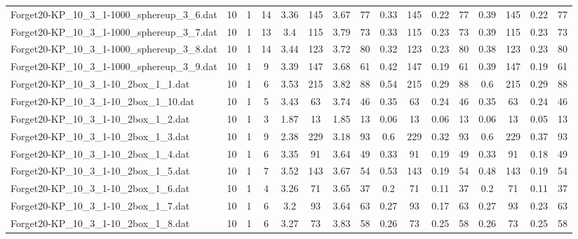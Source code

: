 \begin{sidewaystable}[!ht]
{\begin{tabular}{lccccccccccccccc}
Forget20-KP\_10\_3\_1-1000\_sphereup\_3\_6.dat & 10 & 1 & 14 & 3.36 & 145 & 3.67 & 77 & 0.33 & 145 &  \textcolor{blue2}{0.22} & 77 & 0.39 & 145 &  \textcolor{blue2}{0.22} & 77 \\
Forget20-KP\_10\_3\_1-1000\_sphereup\_3\_7.dat & 10 & 1 & 13 & 3.4 & 115 & 3.79 & 73 & 0.33 & 115 &  \textcolor{blue2}{0.23} & 73 & 0.39 & 115 &  \textcolor{blue2}{0.23} & 73 \\
Forget20-KP\_10\_3\_1-1000\_sphereup\_3\_8.dat & 10 & 1 & 14 & 3.44 & 123 & 3.72 & 80 & 0.32 & 123 &  \textcolor{blue2}{0.23} & 80 & 0.38 & 123 &  \textcolor{blue2}{0.23} & 80 \\
Forget20-KP\_10\_3\_1-1000\_sphereup\_3\_9.dat & 10 & 1 & 9 & 3.39 & 147 & 3.68 & 61 & 0.42 & 147 &  \textcolor{blue2}{0.19} & 61 & 0.39 & 147 &  \textcolor{blue2}{0.19} & 61 \\
Forget20-KP\_10\_3\_1-10\_2box\_1\_1.dat & 10 & 1 & 6 & 3.53 & 215 & 3.82 & 88 & 0.54 & 215 &  \textcolor{blue2}{0.29} & 88 & 0.6 & 215 &  \textcolor{blue2}{0.29} & 88 \\
Forget20-KP\_10\_3\_1-10\_2box\_1\_10.dat & 10 & 1 & 5 & 3.43 & 63 & 3.74 & 46 & 0.35 & 63 &  \textcolor{blue2}{0.24} & 46 & 0.35 & 63 &  \textcolor{blue2}{0.24} & 46 \\
Forget20-KP\_10\_3\_1-10\_2box\_1\_2.dat & 10 & 1 & 3 & 1.87 & 13 & 1.85 & 13 & 0.06 & 13 & 0.06 & 13 & 0.06 & 13 &  \textcolor{blue2}{0.05} & 13 \\
Forget20-KP\_10\_3\_1-10\_2box\_1\_3.dat & 10 & 1 & 9 & 2.38 & 229 & 3.18 & 93 & 0.6 & 229 &  \textcolor{blue2}{0.32} & 93 & 0.6 & 229 & 0.37 & 93 \\
Forget20-KP\_10\_3\_1-10\_2box\_1\_4.dat & 10 & 1 & 6 & 3.35 & 91 & 3.64 & 49 & 0.33 & 91 & 0.19 & 49 & 0.33 & 91 &  \textcolor{blue2}{0.18} & 49 \\
Forget20-KP\_10\_3\_1-10\_2box\_1\_5.dat & 10 & 1 & 7 & 3.52 & 143 & 3.67 & 54 & 0.53 & 143 &  \textcolor{blue2}{0.19} & 54 & 0.48 & 143 &  \textcolor{blue2}{0.19} & 54 \\
Forget20-KP\_10\_3\_1-10\_2box\_1\_6.dat & 10 & 1 & 4 & 3.26 & 71 & 3.65 & 37 & 0.2 & 71 &  \textcolor{blue2}{0.11} & 37 & 0.2 & 71 &  \textcolor{blue2}{0.11} & 37 \\
Forget20-KP\_10\_3\_1-10\_2box\_1\_7.dat & 10 & 1 & 6 & 3.2 & 93 & 3.64 & 63 & 0.27 & 93 &  \textcolor{blue2}{0.17} & 63 & 0.27 & 93 & 0.23 & 63 \\
Forget20-KP\_10\_3\_1-10\_2box\_1\_8.dat & 10 & 1 & 6 & 3.27 & 73 & 3.83 & 58 & 0.26 & 73 &  \textcolor{blue2}{0.25} & 58 & 0.26 & 73 &  \textcolor{blue2}{0.25} & 58 \\

\end{tabular}}
\end{sidewaystable}

